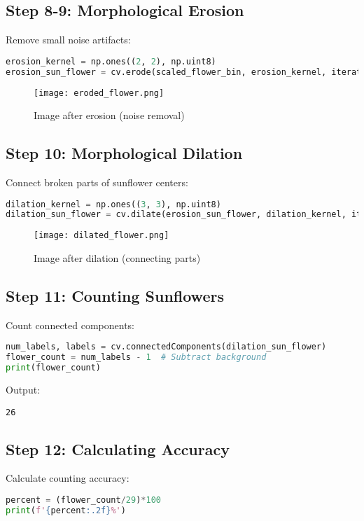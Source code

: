 \documentclass[12pt]{article}
\begin{document}
\subsection{Step 8-9: Morphological Erosion}
Remove small noise artifacts:
\begin{lstlisting}[language=Python]
erosion_kernel = np.ones((2, 2), np.uint8)
erosion_sun_flower = cv.erode(scaled_flower_bin, erosion_kernel, iterations=3)
\end{lstlisting}

\begin{figure}[H]
    \centering
    \texttt{[image: eroded\_flower.png]}
    \caption{Image after erosion (noise removal)}
    \label{fig:eroded}
\end{figure}

\subsection{Step 10: Morphological Dilation}
Connect broken parts of sunflower centers:
\begin{lstlisting}[language=Python]
dilation_kernel = np.ones((3, 3), np.uint8)
dilation_sun_flower = cv.dilate(erosion_sun_flower, dilation_kernel, iterations=5)
\end{lstlisting}

\begin{figure}[H]
    \centering
    \texttt{[image: dilated\_flower.png]}
    \caption{Image after dilation (connecting parts)}
    \label{fig:dilated}
\end{figure}

\subsection{Step 11: Counting Sunflowers}
Count connected components:
\begin{lstlisting}[language=Python]
num_labels, labels = cv.connectedComponents(dilation_sun_flower)
flower_count = num_labels - 1  # Subtract background
print(flower_count)
\end{lstlisting}

Output:
\begin{verbatim}
26
\end{verbatim}

\subsection{Step 12: Calculating Accuracy}
Calculate counting accuracy:
\begin{lstlisting}[language=Python]
percent = (flower_count/29)*100
print(f'{percent:.2f}%')
\end{lstlisting}
\end{document}

